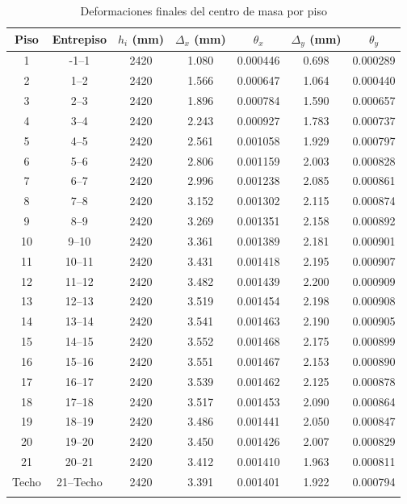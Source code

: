 \begin{table}[H]
    \centering
    \small
    \caption{Deformaciones finales del centro de masa por piso}
    \begin{tabular}{ccccccc}
    \hline
    Piso & Entrepiso & $h_i$ (mm) & $\Delta_x$ (mm) & $\theta_x$ & $\Delta_y$ (mm) & $\theta_y$ \\
    \hline
    1 & -1--1 & 2420 & 1.080 & 0.000446 & 0.698 & 0.000289 \\
    2 & 1--2 & 2420 & 1.566 & 0.000647 & 1.064 & 0.000440 \\
    3 & 2--3 & 2420 & 1.896 & 0.000784 & 1.590 & 0.000657 \\
    4 & 3--4 & 2420 & 2.243 & 0.000927 & 1.783 & 0.000737 \\
    5 & 4--5 & 2420 & 2.561 & 0.001058 & 1.929 & 0.000797 \\
    6 & 5--6 & 2420 & 2.806 & 0.001159 & 2.003 & 0.000828 \\
    7 & 6--7 & 2420 & 2.996 & 0.001238 & 2.085 & 0.000861 \\
    8 & 7--8 & 2420 & 3.152 & 0.001302 & 2.115 & 0.000874 \\
    9 & 8--9 & 2420 & 3.269 & 0.001351 & 2.158 & 0.000892 \\
    10 & 9--10 & 2420 & 3.361 & 0.001389 & 2.181 & 0.000901 \\
    11 & 10--11 & 2420 & 3.431 & 0.001418 & 2.195 & 0.000907 \\
    12 & 11--12 & 2420 & 3.482 & 0.001439 & 2.200 & 0.000909 \\
    13 & 12--13 & 2420 & 3.519 & 0.001454 & 2.198 & 0.000908 \\
    14 & 13--14 & 2420 & 3.541 & 0.001463 & 2.190 & 0.000905 \\
    15 & 14--15 & 2420 & 3.552 & 0.001468 & 2.175 & 0.000899 \\
    16 & 15--16 & 2420 & 3.551 & 0.001467 & 2.153 & 0.000890 \\
    17 & 16--17 & 2420 & 3.539 & 0.001462 & 2.125 & 0.000878 \\
    18 & 17--18 & 2420 & 3.517 & 0.001453 & 2.090 & 0.000864 \\
    19 & 18--19 & 2420 & 3.486 & 0.001441 & 2.050 & 0.000847 \\
    20 & 19--20 & 2420 & 3.450 & 0.001426 & 2.007 & 0.000829 \\
    21 & 20--21 & 2420 & 3.412 & 0.001410 & 1.963 & 0.000811 \\
    Techo & 21--Techo & 2420 & 3.391 & 0.001401 & 1.922 & 0.000794 \\
    \hline
        \vspace{0.001cm}
    \end{tabular}
    
\end{table}


